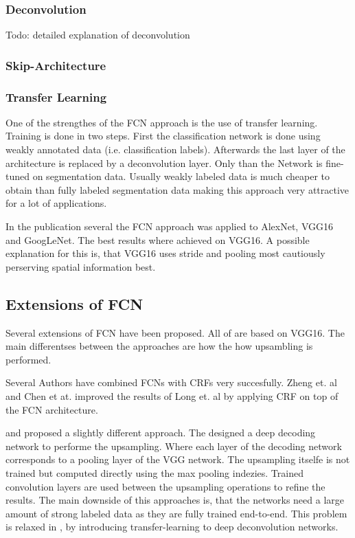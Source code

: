 \subsubsection{Deconvolution} Todo: detailed explanation of deconvolution



\subsubsection{Skip-Architecture}



\subsubsection{Transfer Learning} One of the strengthes of the FCN approach is the use of transfer learning. Training is done in two steps. First the classification network is done using weakly annotated data (i.e. classification labels). Afterwards the last layer of the architecture is replaced by a deconvolution layer. Only than the Network is fine-tuned on segmentation data. Usually weakly labeled data is much cheaper to obtain than fully labeled segmentation data making this approach very attractive for a lot of applications.


In the publication several the FCN approach was applied to AlexNet, VGG16 and GoogLeNet. The best results where achieved on VGG16. A possible explanation for this is, that VGG16 uses stride and pooling most cautiously perserving spatial information best.




\subsection{Extensions of FCN}

Several extensions of FCN have been proposed. All of are based on VGG16. The main differentses between the approaches are how the how upsambling is performed. 

Several Authors have combined FCNs with CRFs very succesfully. Zheng et. al \cite{CRF1} and Chen et at. \cite{CRF2} improved the results of Long et. al \cite{fcn} by applying \gls{CRF} on top of the FCN architecture. 

\cite{deconv1} and \cite{segnet} proposed a slightly different approach. The designed a deep decoding network to performe the upsampling. Where each layer of the decoding network corresponds to a pooling layer of the VGG network. The upsampling itselfe is not trained but computed directly using the max pooling indezies. Trained convolution layers are used between the upsampling operations to refine the results. The main downside of this approaches is, that the networks need a large amount of strong labeled data as they are fully trained end-to-end. This problem is relaxed in \cite{decoupled}, by introducing transfer-learning to deep deconvolution networks.





